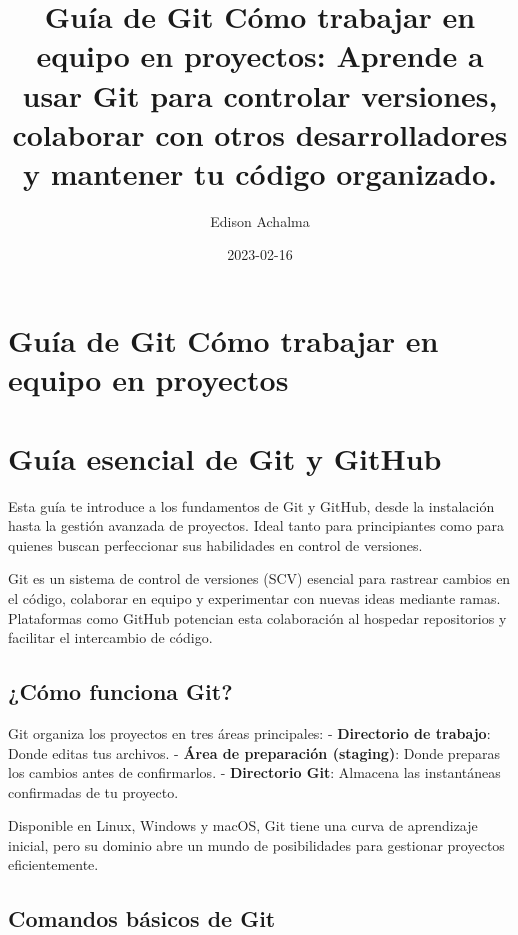 \documentclass[
  doc,
  floatsintext,
  longtable,
  a4paper,
  nolmodern,
  notxfonts,
  notimes,
  colorlinks=true,linkcolor=blue,citecolor=blue,urlcolor=blue]{apa7}
\title{Guía de Git Cómo trabajar en equipo en proyectos: Aprende a usar
Git para controlar versiones, colaborar con otros desarrolladores y
mantener tu código organizado.}
\author{Edison Achalma}
\affiliation{
{Escuela Profesional de Economía, Universidad Nacional de San Cristóbal
de Huamanga}}
\date{2023-02-16}
\begin{document}
\maketitle

\hypertarget{toc}{}
\tableofcontents
\newpage
\section[Introduction]{Guía de Git Cómo trabajar en equipo en proyectos}

\setcounter{secnumdepth}{-\maxdimen} %

\setlength\LTleft{0pt}


\section{Guía esencial de Git y
GitHub}\label{guuxeda-esencial-de-git-y-github}

Esta guía te introduce a los fundamentos de Git y GitHub, desde la
instalación hasta la gestión avanzada de proyectos. Ideal tanto para
principiantes como para quienes buscan perfeccionar sus habilidades en
control de versiones.

Git es un sistema de control de versiones (SCV) esencial para rastrear
cambios en el código, colaborar en equipo y experimentar con nuevas
ideas mediante ramas. Plataformas como GitHub potencian esta
colaboración al hospedar repositorios y facilitar el intercambio de
código.

\subsection{¿Cómo funciona Git?}\label{cuxf3mo-funciona-git}

Git organiza los proyectos en tres áreas principales: -
\textbf{Directorio de trabajo}: Donde editas tus archivos. -
\textbf{Área de preparación (staging)}: Donde preparas los cambios antes
de confirmarlos. - \textbf{Directorio Git}: Almacena las instantáneas
confirmadas de tu proyecto.

Disponible en Linux, Windows y macOS, Git tiene una curva de aprendizaje
inicial, pero su dominio abre un mundo de posibilidades para gestionar
proyectos eficientemente.

\subsection{Comandos básicos de Git}\label{comandos-buxe1sicos-de-git}
\end{document}
